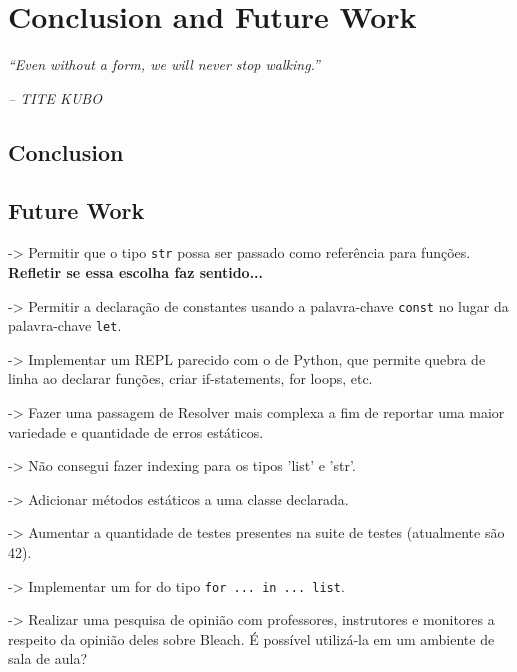 \chapter{Conclusion and Future Work} \label{cap:conclusao}

\begin{displayquote}
    \begin{center}
        \textit{``Even without a form, we will never stop walking.''}
    \end{center}
\end{displayquote}

\begin{flushright}
   \textit{-- TITE KUBO}
\end{flushright}

\section{Conclusion}

\section{Future Work}
-> Permitir que o tipo \texttt{str} possa ser passado como referência para funções. \textbf{Refletir se essa escolha faz sentido...}

-> Permitir a declaração de constantes usando a palavra-chave \texttt{const} no lugar da palavra-chave \texttt{let}.

-> Implementar um REPL parecido com o de Python, que permite quebra de linha ao declarar funções, criar if-statements, for loops, etc.

-> Fazer uma passagem de Resolver mais complexa a fim de reportar uma maior variedade e quantidade de erros estáticos.

-> Não consegui fazer indexing para os tipos 'list' e 'str'.

-> Adicionar métodos estáticos a uma classe declarada.

-> Aumentar a quantidade de testes presentes na suite de testes (atualmente são 42).

-> Implementar um for do tipo \texttt{for ... in ... list}.

-> Realizar uma pesquisa de opinião com professores, instrutores e monitores a respeito da opinião deles sobre Bleach. É possível utilizá-la em um ambiente de sala de aula?

